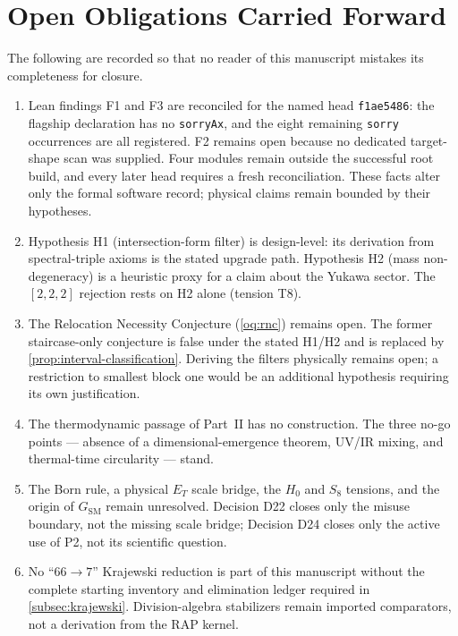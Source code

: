 \documentclass[12pt,a4paper,twoside]{article}
\theoremstyle{plain}
\theoremstyle{definition}
\theoremstyle{remark}
\begin{document}
\section*{Open Obligations Carried Forward}

\noindent The following are recorded so that no reader of this manuscript
mistakes its completeness for closure.

\begin{enumerate}[leftmargin=1.6em,itemsep=0.25em]
\item Lean findings F1 and F3 are reconciled for the named head
\texttt{f1ae5486}: the flagship declaration has no \texttt{sorryAx}, and the
eight remaining \texttt{sorry} occurrences are all registered. F2 remains
open because no dedicated target-shape scan was supplied. Four modules remain
outside the successful root build, and every later head requires a fresh
reconciliation. These facts alter only the formal software record; physical
claims remain bounded by their hypotheses.
\item Hypothesis H1 (intersection-form filter) is design-level: its
derivation from spectral-triple axioms is the stated upgrade path.
Hypothesis H2 (mass non-degeneracy) is a heuristic proxy for a claim
about the Yukawa sector. The $[2,2,2]$ rejection rests on H2 alone
(tension T8).
\item The Relocation Necessity Conjecture (\cref{oq:rnc}) remains open.
The former staircase-only conjecture is false under the stated H1/H2 and
is replaced by \cref{prop:interval-classification}. Deriving the filters
physically remains open; a restriction to smallest block one would be an
additional hypothesis requiring its own justification.
\item The thermodynamic passage of Part~II has no construction. The
three no-go points --- absence of a dimensional-emergence theorem,
UV/IR mixing, and thermal-time circularity --- stand.
\item The Born rule, a physical $E_T$ scale bridge, the $H_0$ and $S_8$
tensions, and the origin of $G_{\mathrm{SM}}$ remain unresolved. Decision
D22 closes only the misuse boundary, not the missing scale bridge; Decision
D24 closes only the active use of P2, not its scientific question.
\item No ``$66\to7$'' Krajewski reduction is part of this manuscript
without the complete starting inventory and elimination ledger required in
\cref{subsec:krajewski}. Division-algebra stabilizers remain imported
comparators, not a derivation from the RAP kernel.
\end{enumerate}
\end{document}
